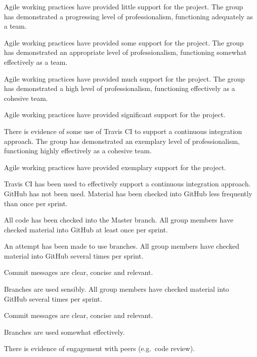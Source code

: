 \documentclass{../fal_assignment}
\begin{document}
\begin{markingrubric}
            \par Agile working practices have provided little support for the project.
        \grade The group has demonstrated a progressing level of professionalism,
            functioning adequately as a team.
            \par Agile working practices have provided some support for the project.
        \grade The group has demonstrated an appropriate level of professionalism,
            functioning somewhat effectively as a team.
            \par Agile working practices have provided much support for the project.
        \grade The group has demonstrated a high level of professionalism,
            functioning effectively as a cohesive team.
            \par Agile working practices have provided significant support for the project.
            \par There is evidence of some use of Travis CI to support a continuous integration approach.
        \grade The group has demonstrated an exemplary level of professionalism,
            functioning highly effectively as a cohesive team.
            \par Agile working practices have provided exemplary support for the project.
            \par Travis CI has been used to effectively support a continuous integration approach.
%
        \grade\fail GitHub has not been used.
        \grade Material has been checked into GitHub less frequently than once per sprint.
            \par All code has been checked into the Master branch.
        \grade All group members have checked material into GitHub at least once per sprint.
            \par An attempt has been made to use branches.
        \grade All group members have checked material into GitHub several times per sprint.
            \par Commit messages are clear, concise and relevant.
            \par Branches are used sensibly.
        \grade All group members have checked material into GitHub several times per sprint.
            \par Commit messages are clear, concise and relevant.
            \par Branches are used somewhat effectively.
            \par There is evidence of engagement with peers (e.g.\ code review).

\end{markingrubric}
\end{document}
